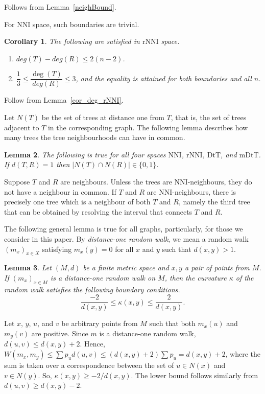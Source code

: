 \documentclass{amsart}
\newtheorem{lemma}{Lemma}
\newtheorem{corollary}[lemma]{Corollary}
\newcommand{\dts}{\mathrm{DtT}}
\newcommand{\nni}{\mathrm{NNI}}
\newcommand{\rnni}{\mathrm{rNNI}}
\newcommand{\mdts}{\mathrm{mDtT}}
\begin{document}
\proof
Follows from Lemma~\ref{neighBound}. 
\endproof

For $\nni$ space, such boundaries are trivial. 

\begin{corollary}\label{degreeBoundsNNI}
The following are satisfied in $\rnni$ space. 
\begin{enumerate}[(1)]
\item $deg(T)-deg(R) \leq 2(n-2)$.
\item $\dfrac13 \leq \dfrac{\deg(T)}{deg(R)} \leq 3$, and the equality is attained for both boundaries and all $n$. 
\end{enumerate}
\end{corollary}

\proof
Follow from Lemma~\ref{cor_deg_rNNI}. 
\endproof

Let $N(T)$ be the set of trees at distance one from $T$, that is, the set of trees adjacent to $T$ in the corresponding graph. 
The following lemma describes how many trees the tree neighbourhoods can have in common. 

\begin{lemma}\label{intersecNeighb}
The following is true for all four spaces $\nni$, $\rnni$, $\dts$, and $\mdts$.
If $d(T,R) = 1$ then $|N(T)\cap N(R)|\in\{0,1\}$.
\end{lemma}

\proof
Suppose $T$ and $R$ are neighbours. 
Unless the trees are NNI-neighbours, they do not have a neighbour in common. 
If $T$ and $R$ are NNI-neighbours, there is precisely one tree which is a neighbour of both $T$ and $R$, namely the third tree that can be obtained by resolving the interval that connects $T$ and $R$. 
\endproof

The following general lemma is true for all graphs, particularly, for those we consider in this paper.  
By {\em distance-one random walk}, we mean a random walk $(m_x)_{x \in X}$ satisfying $m_x(y) = 0$ for all $x$ and $y$ such that $d(x,y) > 1$. 

\begin{lemma}\label{curvBoundGeneral}
Let $(M,d)$ be a finite metric space and $x,y$ a pair of points from $M$. If
$(m_x)_{x \in M}$ is a distance-one random walk on $M$, then the curvature 
$\kappa$ of the random walk satisfies the following boundary conditions. 
\[
\dfrac{-2}{d(x,y)} \leq \kappa(x,y) \leq \dfrac{2}{d(x,y)}.
\]
\end{lemma}

\proof
Let $x$, $y$, $u$, and $v$ be arbitrary points from $M$ such that both $m_x(u)$
and $m_y(v)$ are positive. Since $m$ is a distance-one random walk, 
$d(u,v) \leq d(x,y) + 2$. Hence, 
$W(m_x,m_y) \leq \sum p_u d(u,v) \leq (d(x,y)+2)\sum p_u = d(x,y) + 2$, 
where the sum is taken over a correspondence between the set of $u \in N(x)$ and 
$v \in N(y)$. So, $\kappa(x,y) \geq - 2/d(x,y)$. The lower bound follows 
similarly from $d(u,v) \geq d(x,y) - 2$.
\endproof
\end{document}
